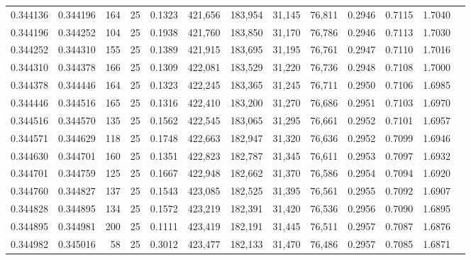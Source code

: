 \begin{tabular}{rrrrrrrrrrrrr}
0.344136 & 0.344196 &   164 &  25 &                                     0.1323 & 421,656 & 183,954 &  31,145 &  76,811 & 0.2946 & 0.7115 & 1.7040 \\
0.344196 & 0.344252 &   104 &  25 &                                     0.1938 & 421,760 & 183,850 &  31,170 &  76,786 & 0.2946 & 0.7113 & 1.7030 \\
0.344252 & 0.344310 &   155 &  25 &                                     0.1389 & 421,915 & 183,695 &  31,195 &  76,761 & 0.2947 & 0.7110 & 1.7016 \\
0.344310 & 0.344378 &   166 &  25 &                                     0.1309 & 422,081 & 183,529 &  31,220 &  76,736 & 0.2948 & 0.7108 & 1.7000 \\
0.344378 & 0.344446 &   164 &  25 &                                     0.1323 & 422,245 & 183,365 &  31,245 &  76,711 & 0.2950 & 0.7106 & 1.6985 \\
0.344446 & 0.344516 &   165 &  25 &                                     0.1316 & 422,410 & 183,200 &  31,270 &  76,686 & 0.2951 & 0.7103 & 1.6970 \\
0.344516 & 0.344570 &   135 &  25 &                                     0.1562 & 422,545 & 183,065 &  31,295 &  76,661 & 0.2952 & 0.7101 & 1.6957 \\
0.344571 & 0.344629 &   118 &  25 &                                     0.1748 & 422,663 & 182,947 &  31,320 &  76,636 & 0.2952 & 0.7099 & 1.6946 \\
0.344630 & 0.344701 &   160 &  25 &                                     0.1351 & 422,823 & 182,787 &  31,345 &  76,611 & 0.2953 & 0.7097 & 1.6932 \\
0.344701 & 0.344759 &   125 &  25 &                                     0.1667 & 422,948 & 182,662 &  31,370 &  76,586 & 0.2954 & 0.7094 & 1.6920 \\
0.344760 & 0.344827 &   137 &  25 &                                     0.1543 & 423,085 & 182,525 &  31,395 &  76,561 & 0.2955 & 0.7092 & 1.6907 \\
0.344828 & 0.344895 &   134 &  25 &                                     0.1572 & 423,219 & 182,391 &  31,420 &  76,536 & 0.2956 & 0.7090 & 1.6895 \\
0.344895 & 0.344981 &   200 &  25 &                                     0.1111 & 423,419 & 182,191 &  31,445 &  76,511 & 0.2957 & 0.7087 & 1.6876 \\
0.344982 & 0.345016 &    58 &  25 &                                     0.3012 & 423,477 & 182,133 &  31,470 &  76,486 & 0.2957 & 0.7085 & 1.6871 \\

\end{tabular}

